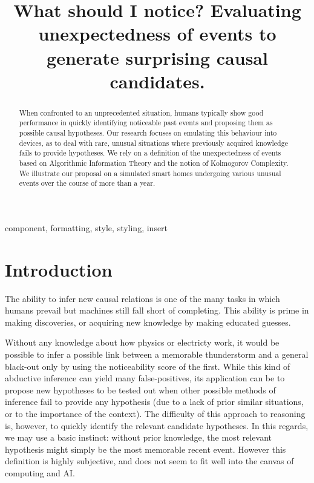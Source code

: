 \documentclass[conference]{IEEEtran}
\begin{document}
\title{
  What should I notice? Evaluating unexpectedness of events to generate surprising causal candidates.
}
\author{

}

\maketitle

\begin{abstract}
  When confronted to an unprecedented situation, humans typically show good performance in quickly identifying noticeable past events and proposing them as possible causal hypotheses. Our research focuses on emulating this behaviour into devices, as to deal with rare, unusual situations where previously acquired knowledge fails to provide hypotheses. We rely on a definition of the unexpectedness of events based on Algorithmic Information Theory and the notion of Kolmogorov Complexity. We illustrate our proposal on a simulated smart homes undergoing various unusual events over the course of more than a year.
\end{abstract}

\begin{IEEEkeywords}
component, formatting, style, styling, insert
\end{IEEEkeywords}

\section{Introduction}

The ability to infer new causal relations is one of the many tasks in which humans prevail but machines still fall short of completing. This ability is prime in making discoveries, or acquiring new knowledge by making educated guesses.

Without any knowledge about how physics or electricty work, it would be possible to infer a possible link between a memorable thunderstorm and a general black-out only by using the noticeability score of the first. While this kind of abductive inference can yield many false-positives, its application can be to propose new hypotheses to be tested out when other possible methods of inference fail to provide any hypothesis (due to a lack of prior similar situations, or to the importance of the context). The difficulty of this approach to reasoning is, however, to quickly identify the relevant candidate hypotheses. In this regards, we may use a basic instinct: without prior knowledge, the most relevant hypothesis might simply be the most memorable recent event. However this definition is highly subjective, and does not seem to fit well into the canvas of computing and AI.
\end{document}
